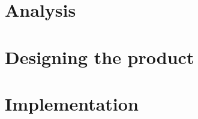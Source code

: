 




\newpage
\thispagestyle{empty}
\mbox{}



\setcounter{secnumdepth}{3}
\setcounter{tocdepth}{1}

\tableofcontents





\part{Analysis}









\part{Designing the product}















\part{Implementation}

